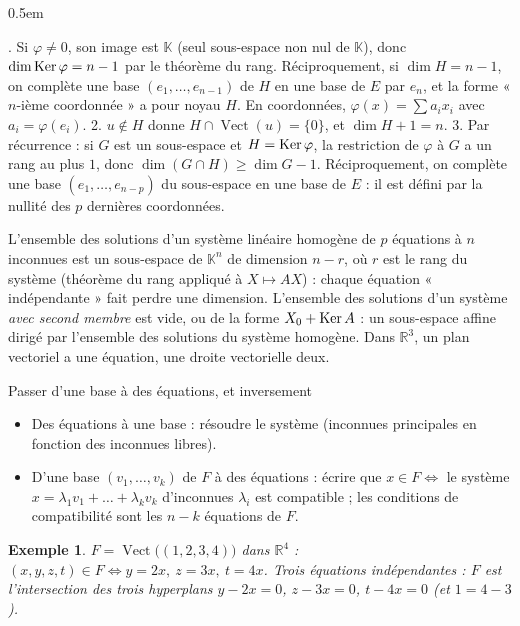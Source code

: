 \documentclass[a4paper,11pt]{article}
\makeatletter
\numberwithin{equation}{section}
\numberwithin{figure}{section}
\numberwithin{table}{section}
\theoremstyle{enonce}
\theoremstyle{exemple}
\newtheorem{exemple}[definition]{Exemple}
\theoremstyle{remarque}
\renewcommand{\proofname}{Démonstration}
\renewenvironment{proof}[1][\proofname]{\par\pushQED{\qed}\normalfont
  \topsep0.5em\relax\trivlist\item[\hskip\labelsep\sffamily\itshape\color{Gris}#1.]\ignorespaces}
  {\popQED\endtrivlist\@endpefalse}
\newcommand{\K}{\mathbb{K}}
\newcommand{\R}{\mathbb{R}}
\newcommand{\vect}{\operatorname{Vect}}
\makeatother
\begin{document}
\begin{proof}
1. Si $\varphi\neq0$, son image est $\K$ (seul sous-espace non nul de $\K$), donc $\dim\operatorname{Ker}\varphi=n-1$ par le théorème du rang.
Réciproquement, si $\dim H=n-1$, on complète une base $(e_1,\dots,e_{n-1})$ de $H$ en une base de $E$ par $e_n$, et la forme
« $n$-ième coordonnée » a pour noyau $H$. En coordonnées, $\varphi(x)=\sum a_ix_i$ avec $a_i=\varphi(e_i)$.
2. $u\notin H$ donne $H\cap\vect(u)=\{0\}$, et $\dim H+1=n$.
3. Par récurrence : si $G$ est un sous-espace et $H=\operatorname{Ker}\varphi$, la restriction de $\varphi$ à $G$ a un rang au plus $1$, donc
$\dim(G\cap H)\geq\dim G-1$. Réciproquement, on complète une base $(e_1,\dots,e_{n-p})$ du sous-espace en une base de $E$ :
il est défini par la nullité des $p$ dernières coordonnées.
\end{proof}

\begin{enpratique}
L'ensemble des solutions d'un système linéaire homogène de $p$ équations à $n$ inconnues est un sous-espace de $\K^n$ de dimension
$n-r$, où $r$ est le rang du système (théorème du rang appliqué à $X\mapsto AX$) : chaque équation « indépendante » fait perdre
une dimension. L'ensemble des solutions d'un système \emph{avec second membre} est vide, ou de la forme $X_0+\operatorname{Ker} A$ : un sous-espace
affine dirigé par l'ensemble des solutions du système homogène. Dans $\R^3$, un plan vectoriel a une équation, une droite vectorielle deux.
\end{enpratique}

\begin{methode}{Passer d'une base à des équations, et inversement}\label{m:equations}
\begin{itemize}
\item Des équations à une base : résoudre le système (inconnues principales en fonction des inconnues libres).
\item D'une base $(v_1,\dots,v_k)$ de $F$ à des équations : écrire que $x\in F\iff$ le système $x=\lambda_1v_1+\dots+\lambda_kv_k$
d'inconnues $\lambda_i$ est compatible ; les conditions de compatibilité sont les $n-k$ équations de $F$.
\end{itemize}
\end{methode}

\begin{exemple}
$F=\vect\big((1,2,3,4)\big)$ dans $\R^4$ : $(x,y,z,t)\in F\iff y=2x,\ z=3x,\ t=4x$. Trois équations indépendantes : $F$ est
l'intersection des trois hyperplans $y-2x=0$, $z-3x=0$, $t-4x=0$ (et $1=4-3$).
\end{exemple}
\end{document}
